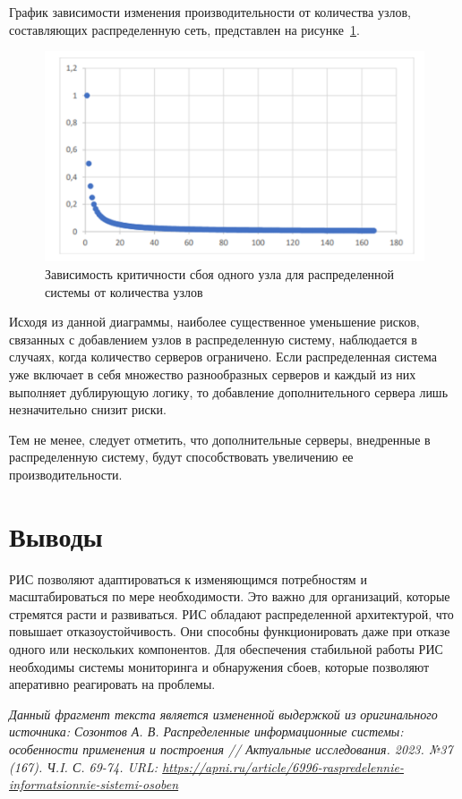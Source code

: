 \documentclass[report, draught]{fefudoc}
\begin{document}
График зависимости изменения производительности от количества узлов, составляющих распределенную сеть, представлен на рисунке~\ref{fig_scalability}.

\begin{figure}
\centering
\includegraphics[width=\textwidth]{2}
\caption{Зависимость критичности сбоя одного узла для распределенной системы от количества узлов}
\label{fig_scalability}
\end{figure}

Исходя из данной диаграммы, наиболее существенное уменьшение рисков, связанных с добавлением узлов в распределенную систему, наблюдается в случаях, когда количество серверов ограничено. Если распределенная система уже включает в себя множество разнообразных серверов и каждый из них выполняет дублирующую логику, то добавление дополнительного сервера лишь незначительно снизит риски.

Тем не менее, следует отметить, что дополнительные серверы, внедренные в распределенную систему, будут способствовать увеличению ее производительности.

\section*{Выводы}
РИС позволяют адаптироваться к изменяющимся потребностям и масштабироваться по мере необходимости. Это важно для организаций, которые стремятся расти и развиваться. РИС обладают распределенной архитектурой, что повышает отказоустойчивость. Они способны функционировать даже при отказе одного или нескольких компонентов. Для обеспечения стабильной работы РИС необходимы системы мониторинга и обнаружения сбоев, которые позволяют аперативно реагировать на проблемы.

\itshape Данный фрагмент текста является измененной выдержкой из оригинального источника: Созонтов А. В. Распределенные информационные системы: особенности применения и построения // Актуальные исследования. 2023. №37 (167). Ч.I.  С. 69-74. URL: \url{https://apni.ru/article/6996-raspredelennie-informatsionnie-sistemi-osoben}
\normalfont
\end{document}
